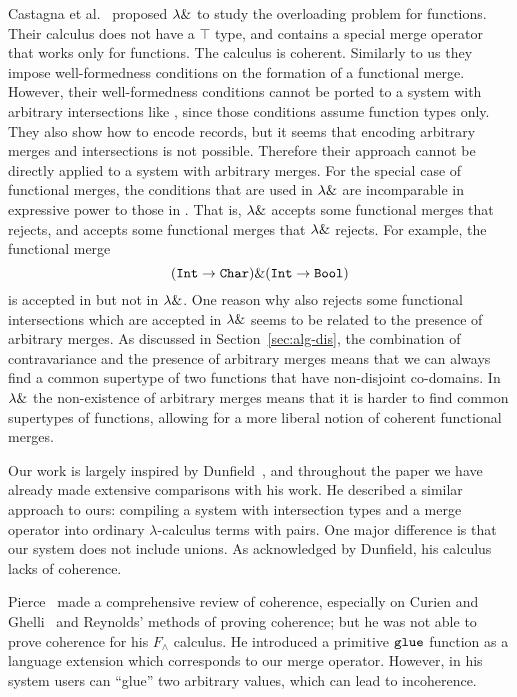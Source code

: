 Castagna et al.~\cite{Castagna92calculus} proposed $\lambda \&$ to study
the overloading problem for functions. Their calculus does not have a
$\top$ type, and contains a special merge operator that works only for
functions. The calculus is coherent. Similarly to us they impose
well-formedness conditions on the formation of a functional
merge. However, their well-formedness conditions cannot be ported to a
system with arbitrary intersections like \name, since those conditions
assume function types only.  They also show how to encode records, but
it seems that encoding arbitrary merges and intersections is not
possible. Therefore their approach cannot be directly applied to a
system with arbitrary merges.  For the special case of functional
merges, the conditions that are used in $\lambda \&$ are incomparable in
expressive power to those in \name. That is, $\lambda \&$ accepts some
functional merges that \name rejects, and \name accepts some
functional merges that $\lambda \&$ rejects. For example, the functional
merge
\[(\texttt{Int}\to\texttt{Char})\&(\texttt{Int}\to\texttt{Bool})\] 
\noindent is accepted in \name but not in $\lambda \&$. One reason 
why \name also rejects some functional intersections which are 
accepted in $\lambda \&$ seems to be related to the presence of arbitrary 
merges. As discussed in Section~\ref{sec:alg-dis}, the combination of
contravariance and the presence of arbitrary merges means that we can
always find a common supertype of two functions that have non-disjoint
co-domains. In $\lambda \&$ the non-existence of arbitrary merges means
that it is harder to find common supertypes of functions, allowing for
a more liberal notion of coherent functional merges.  

Our work is largely inspired by
Dunfield~\cite{dunfield2014elaborating}, and throughout the paper we
have already made extensive comparisons with his work. He
described a similar approach to ours: compiling a system with intersection types
and a merge operator into ordinary $ \lambda $-calculus terms with pairs. One
major difference is that our system does not include unions. As
acknowledged by Dunfield, his calculus lacks of coherence.

Pierce~\cite{pierce1991programming2} made a comprehensive review
of coherence, especially on Curien and Ghelli~\cite{curienl1990coherence} and
Reynolds' methods of proving coherence; but he was not able to prove coherence
for his $F_\wedge$ calculus. He introduced a primitive $\texttt{glue}$ function as
a language extension which corresponds to our merge operator. However, in his
system users can ``glue'' two arbitrary values, which can lead to incoherence.

